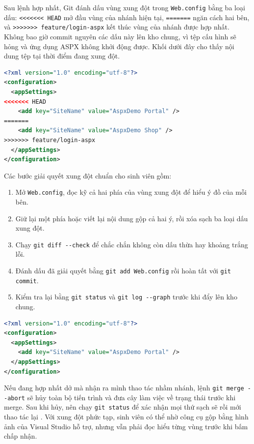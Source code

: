 Sau lệnh hợp nhất, Git đánh dấu vùng xung đột trong \verb|Web.config| bằng ba loại dấu: \verb|<<<<<<< HEAD| mở đầu vùng của nhánh hiện tại, \verb|=======| ngăn cách hai bên, và \verb|>>>>>>> feature/login-aspx| kết thúc vùng của nhánh được hợp nhất. Không bao giờ commit nguyên các dấu này lên kho chung, vì tệp cấu hình sẽ hỏng và ứng dụng ASPX không khởi động được. Khối dưới đây cho thấy nội dung tệp tại thời điểm đang xung đột.

\begin{lstlisting}[language=XML, caption={Đoạn tệp cấu hình đang xung đột}, label={lst:c23-conflict-file}]
<?xml version="1.0" encoding="utf-8"?>
<configuration>
  <appSettings>
<<<<<<< HEAD
    <add key="SiteName" value="AspxDemo Portal" />
=======
    <add key="SiteName" value="AspxDemo Shop" />
>>>>>>> feature/login-aspx
  </appSettings>
</configuration>
\end{lstlisting}

Các bước giải quyết xung đột chuẩn cho sinh viên gồm:
\begin{enumerate}
\item Mở \verb|Web.config|, đọc kỹ cả hai phía của vùng xung đột để hiểu ý đồ của mỗi bên.
\item Giữ lại một phía hoặc viết lại nội dung gộp cả hai ý, rồi xóa sạch ba loại dấu xung đột.
\item Chạy \verb|git diff --check| để chắc chắn không còn dấu thừa hay khoảng trắng lỗi.
\item Đánh dấu đã giải quyết bằng \verb|git add Web.config| rồi hoàn tất với \verb|git commit|.
\item Kiểm tra lại bằng \verb|git status| và \verb|git log --graph| trước khi đẩy lên kho chung.
\end{enumerate}

\begin{lstlisting}[language=XML, caption={Tệp cấu hình sau khi giải quyết xung đột}, label={lst:c23-resolved-file}]
<?xml version="1.0" encoding="utf-8"?>
<configuration>
  <appSettings>
    <add key="SiteName" value="AspxDemo Portal" />
  </appSettings>
</configuration>
\end{lstlisting}

Nếu đang hợp nhất dở mà nhận ra mình thao tác nhầm nhánh, lệnh \verb|git merge --abort| sẽ hủy toàn bộ tiến trình và đưa cây làm việc về trạng thái trước khi merge. Sau khi hủy, nên chạy \verb|git status| để xác nhận mọi thứ sạch sẽ rồi mới thao tác lại \cite{atlassiangit}. Với xung đột phức tạp, sinh viên có thể nhờ công cụ gộp bằng hình ảnh của Visual Studio hỗ trợ, nhưng vẫn phải đọc hiểu từng vùng trước khi bấm chấp nhận.

